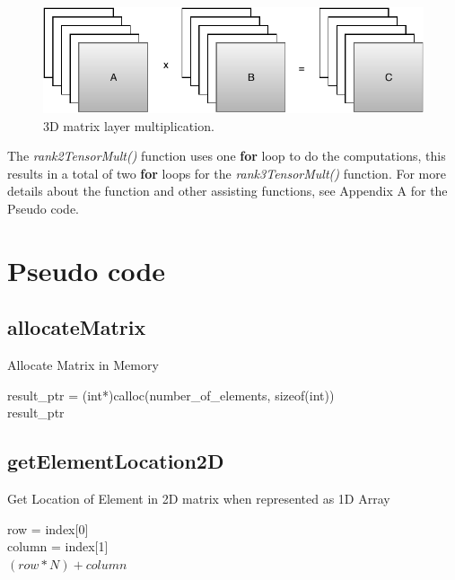 \documentclass[10pt,onecolumn]{article}
\begin{document}
\begin{figure}[H]
\centering
  \includegraphics[width=5in]{3Dmult.pdf}
  \caption{3D matrix layer multiplication.}
  \label{fig:3Dmult}
\end{figure}

\noindent The \textit{rank2TensorMult()} function uses one \textbf{for} loop to do the computations, this results in a total of two \textbf{for} loops for the \textit{rank3TensorMult()} function. For more details about the function and other assisting functions, see Appendix A for the Pseudo code. 


\clearpage
\appendix
\label{App:Apendix}
\section{Pseudo code}
\subsection{allocateMatrix}
    \begin{algorithm}[H]
        \caption{Allocate Matrix in Memory}
        result\_ptr = (int*)calloc(number\_of\_elements, sizeof(int)) \\
        \Return result\_ptr
    \end{algorithm}

\subsection{getElementLocation2D}
    \begin{algorithm}[H]
        \caption{Get Location of Element in 2D matrix when represented as 1D Array}
        row = index[0]\\
        column = index[1]\\
        \Return $(row*N)+column$
    \end{algorithm}
  
\end{document}
